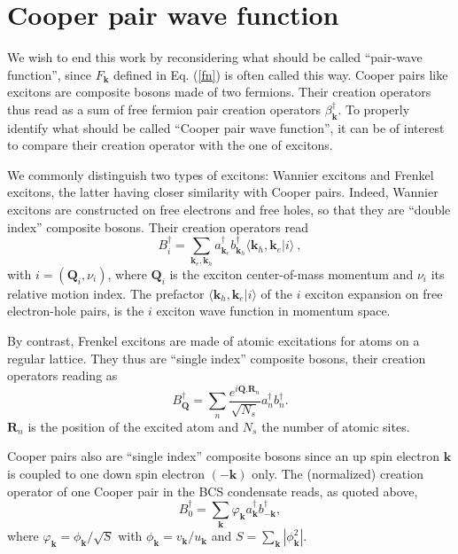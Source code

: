\documentclass[twocolumn,showpacs]{revtex4}
\def\v#1{\mathbf{#1}}
\begin{document}
\section{Cooper pair wave function}

We wish to end this work by reconsidering what should be called ``pair-wave function'', since $F_{\v{k}}$ defined in Eq. (\ref{fn}) is often called this way.
Cooper pairs like excitons are composite bosons made of two fermions. Their creation operators thus read as a sum of free fermion pair creation operators $\beta_{\v k}^\dag$. To properly identify what should be called ``Cooper pair wave function'', it can be of interest to compare their creation operator with the one of excitons.

We commonly distinguish two types of excitons: Wannier excitons and Frenkel excitons, the latter having closer similarity with Cooper pairs. Indeed, Wannier excitons are constructed on free electrons and free holes, so that they are ``double index'' composite bosons. Their creation operators read
\begin{equation}
B_i^\dag=\sum_{\v k_e,\v k_h}a_{\v k_e}^\dag b_{\v k_h}^\dag \langle\v k_h,\v k_e|i\rangle\ ,
\end{equation}
with $i=(\v Q_i,\nu_i)$, where $\v Q_i$ is the exciton center-of-mass momentum and $\nu_i$ its relative motion index. The prefactor $\langle\v k_h,\v k_e|i\rangle$ of the $i$ exciton expansion on free electron-hole pairs, is the $i$ exciton wave function in momentum space.

By contrast, Frenkel excitons are made of atomic excitations for atoms on a regular lattice. They thus are ``single index'' composite bosons, their creation operators reading as
\begin{equation}
B_{\v Q}^\dag=\sum_n\frac{e^{i\v Q.\v R_n}}{\sqrt{N_s}} a_n^\dag b_n^\dag.
\end{equation} 
$\v R_n$ is the position of the excited atom and $N_s$ the number of atomic sites.

Cooper pairs also are ``single index'' composite bosons since an up spin electron $\v k$ is coupled to one down spin electron $(-\v k)$ only. The (normalized) creation operator of one Cooper pair in the BCS condensate reads, as quoted above,
\begin{equation}
B_0^\dag=\sum_{\v k}\varphi_{\v k}a_{\v k}^\dag b_{-\v k}^\dag,
\end{equation}
where $\varphi_{\v k}=\phi_{\v k}/\sqrt{S}$ with $\phi_{\v k}=v_{\v k}/u_{\v k}$ and $S=\sum_{\v k}|\phi_{\v k}^2|$. 
\end{document}
